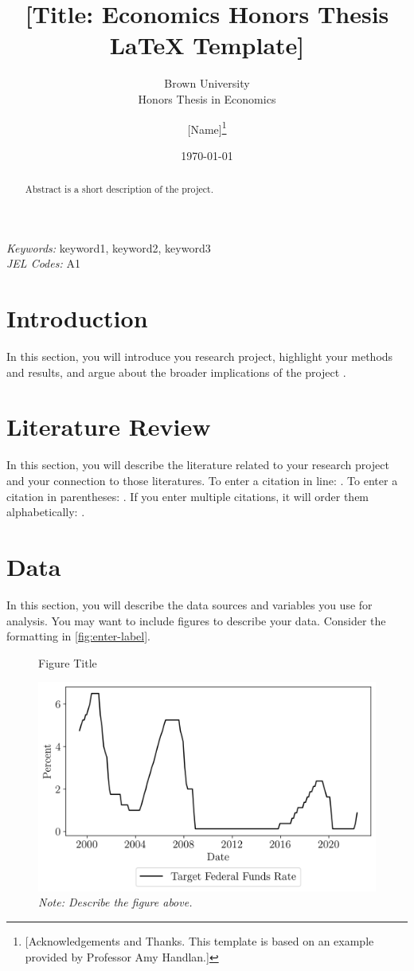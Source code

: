 \documentclass[12pt]{article}
\title{[Title: Economics Honors Thesis LaTeX Template]}
\subtitle{Brown University\\Honors Thesis in Economics}
\author{[Name]\thanks{[Acknowledgements and Thanks. This template is based on an example provided by Professor Amy Handlan.]}}
\date{\today}
\begin{document}
\maketitle

\begin{abstract}
    Abstract is a short description of the project.
\end{abstract} 
\doublespacing
\textit{Keywords:} keyword1, keyword2, keyword3
\\
\textit{JEL Codes:} A1 %
\newpage
{} 
 

\section{Introduction}
In this section, you will introduce you research project, highlight your methods and results, and argue about the broader implications of the project \citet{CitationExample}.

\section{Literature Review}
In this section, you will describe the literature related to your research project and your connection to those literatures. To enter a citation in line: \cite{CitationExample}. To enter a citation in parentheses: \citep{CitationExample}. If you enter multiple citations, it will order them alphabetically: \citep{CitationExample,WorkingPaperExample}.

\section{Data}
In this section, you will describe the data sources and variables you use for analysis. You may want to include figures to describe your data. Consider the formatting in \autoref{fig:enter-label}.

\begin{figure}[ht]
    \centering
    \caption{Figure Title}
    \label{fig:enter-label}
    \includegraphics[width=.75\textwidth]{figures/ExampleGraph_TFFR.png}
    \caption*{\footnotesize \textit{Note: Describe the figure above.}}
\end{figure}
\end{document}
